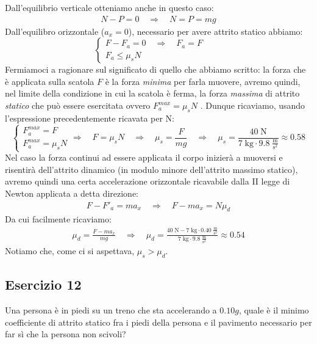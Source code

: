 \documentclass[12pt,a4paper]{book}
\begin{document}
Dall'equilibrio verticale otteniamo anche in questo caso:
%
\begin{gather*}
N-P=0 \quad	\Longrightarrow \quad N=P=mg
\end{gather*}
%
Dall'equilibro orizzontale ($a_x=0$), necessario per avere attrito statico abbiamo:
%
\[
\begin{cases}
F-F_a=0 \quad	\Longrightarrow \quad F_a=F \qquad \\ 
F_a\leq\mu_sN
\end{cases}
\]
%
Fermiamoci a ragionare sul significato di quello che abbiamo scritto: la forza che è applicata sulla scatola $F$ è la forza \textit{minima} per farla muovere, avremo quindi, nel limite della condizione in cui la scatola è ferma, la forza \textit{massima} di attrito \textit{statico} che può essere esercitata ovvero $F_a^{max}=\mu_sN$ . Dunque ricaviamo, usando l'espressione precedentemente ricavata per N:
%
\[
\begin{cases}
F_a^{max}=F      \\ 
F_a^{max}=\mu_sN
\end{cases}
\Longrightarrow \quad F=\mu_sN \quad \Longrightarrow \quad \mu_s=\frac{F}{mg} \quad \Longrightarrow \quad \mu_s=\frac{40\;\text{N}}{7\;\text{kg}\cdot 9.8 \;\frac{\text{m}}{\text{s}^2}}\approx 0.58
\]
%
Nel caso la forza continui ad essere applicata il corpo inizierà a muoversi e risentirà dell'attrito dinamico (in modulo minore dell'attrito massimo statico), avremo quindi una certa accelerazione orizzontale ricavabile dalla II legge di Newton applicata a detta direzione:
%
\begin{gather*}
F-F'_a=ma_x \quad	\Longrightarrow \quad F-ma_x=N\mu_d
\end{gather*}
%
Da cui facilmente ricaviamo:
%
\begin{gather*}
\mu_d=\frac{F-ma_x}{mg} \quad	\Longrightarrow \quad \mu_d=\frac{40\;\text{N}-7\;\text{kg}\cdot 0.40 \;\frac{\text{m}}{\text{s}^2}}{7\;\text{kg}\cdot 9.8 \;\frac{\text{m}}{\text{s}^2}}\approx 0.54
\end{gather*}
%
Notiamo che, come ci si aspettava, $\mu_s>\mu_d$.

\subsection*{Esercizio 12}
Una persona è in piedi su un treno che sta accelerando a $0.10g$, quale è il minimo coefficiente di attrito statico fra i piedi della persona e il pavimento necessario per far sì che la persona non scivoli?
\end{document}
